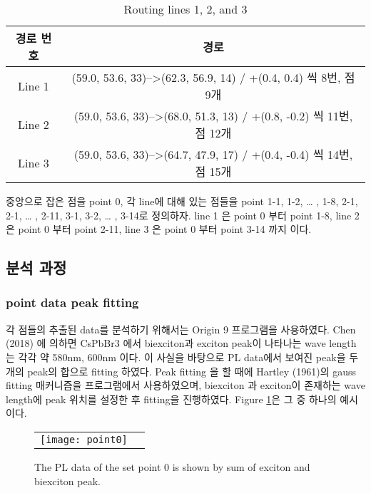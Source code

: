 \begin{table}[H]%
	\caption{Routing lines 1, 2, and 3}
	\label{table01}
	\centering
	\begin{tabular}{c c}
	\toprule
	경로 번호 & 경로\\
	\toprule
	Line 1 & (59.0, 53.6, 33)-->(62.3, 56.9, 14) / +(0.4, 0.4) 씩 8번, 점 9개\\
	Line 2 & (59.0, 53.6, 33)-->(68.0, 51.3, 13) / +(0.8, -0.2) 씩 11번, 점 12개\\
	Line 3 & (59.0, 53.6, 33)-->(64.7, 47.9, 17) / +(0.4, -0.4) 씩 14번, 점 15개\\
	\toprule
	\end{tabular}
	\end{table}

중앙으로 잡은 점을 point 0, 각 line에 대해 있는 점들을 point 1-1, 1-2, … , 1-8, 2-1, 2-1, … , 2-11, 3-1, 3-2, … , 3-14로 정의하자. line 1 은 point 0 부터 point 1-8, line 2 은 point 0 부터 point 2-11, line 3 은 point 0 부터 point 3-14 까지 이다. 
\\

\subsection{분석 과정}
\subsubsection{point data peak fitting}
각 점들의 추출된 data를 분석하기 위해서는 Origin 9 프로그램을 사용하였다. Chen (2018) 에 의하면 CsPbBr3 에서 biexciton과 exciton peak이 나타나는 wave length 는 각각 약 580nm, 600nm 이다\cite{chen2018room}. 이 사실을 바탕으로 PL data에서 보여진 peak을 두개의 peak의 합으로 fitting 하였다. Peak fitting 을 할 때에 Hartley (1961)의 gauss fitting 매커니즘을 프로그램에서 사용하였으며, biexciton 과 exciton이 존재하는 wave length에 peak 위치를 설정한 후 fitting을 진행하였다\cite{hartley1961modified}. Figure \ref{fig:point0}은 그 중 하나의 예시이다.

\begin{figure}[H]
	\begin{center}
		\begin{tabular}{cc}
			\texttt{[image: point0]}
		\end{tabular}
	\end{center}
	\caption{The PL data of the set point 0 is shown by sum of exciton and biexciton peak.}
	\label{fig:point0}  
\end{figure}


